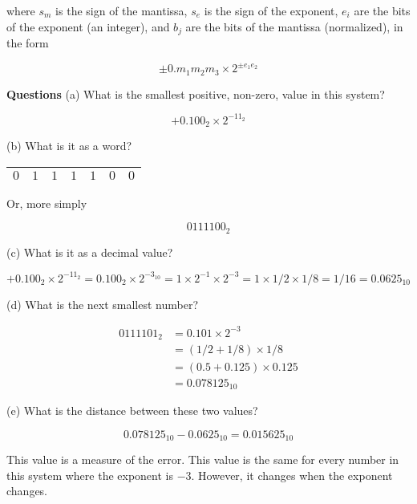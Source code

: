 \documentclass [titlepage,12pt,letter] {article}
\begin{document}
\noindent
where  $s_m$ is the sign of the mantissa, $s_e$ is the sign of the exponent, $e_i$ are the bits of the exponent (an integer), and $b_j$ are the bits of the
mantissa (normalized), in the form

\begin{equation*} 
\pm 0.m_1m_2m_3 \times 2^{\pm e_1e_2}
\end{equation*} 

{\bf Questions}
(a) What is the smallest positive, non-zero, value in this system?

\begin{equation*} 
+0.100_2 \times 2^{-11_2}
\end{equation*} 

(b) What is it as a word? 

\begin{center}
\begin{tabular}{ |c|c|c|c|c|c|c| } 
 \hline
 $0$ & $1$ & $1$ & $1$ & $1$ & $0$ & $0$ \\ 
 \hline
\end{tabular}
\end{center}

Or, more simply

\[0111100_2\]

(c) What is it as a decimal value? 

\begin{equation*} 
+0.100_2 \times 2^{-11_2} = 0.100_2 \times 2^{-3_{10}} = 1 \times 2^{-1} \times 2^{-3} = 1 \times 1/2 \times 1/8 = 1/16 = 0.0625_{10}
\end{equation*} 

(d) What is the next smallest number?

\begin{align*}
0111101_2 &= 0.101 \times 2^{-3} \\
&= (1/2 + 1/8) \times 1/8 \\
&= (0.5 + 0.125) \times 0.125 \\
&= 0.078125_{10}
\end{align*}

(e) What is the distance between these two values?

\[0.078125_{10}-0.0625_{10} = 0.015625_{10}\]

This value is a measure of the error. This value is the same for every number in this system where the exponent is $-3$. However, it changes when the exponent changes.

 
 
\end{document}
